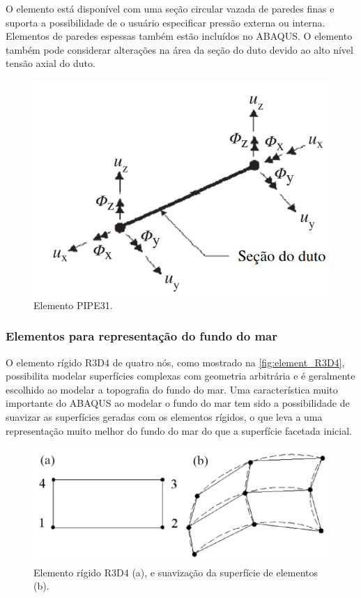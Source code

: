 O elemento está disponível com uma seção circular vazada de paredes finas e suporta a possibilidade de o usuário especificar pressão externa ou interna.
Elementos de paredes espessas também estão incluídos no ABAQUS\@.
O elemento também pode considerar alterações na área da seção do duto devido ao alto nível tensão axial do duto.

\begin{figure}[!ht]
    \centering
    \caption{Elemento PIPE31.}\label{fig:elemen_PIPE31H}
    \includegraphics[width=0.5\linewidth]{imagens/elemen_PIPE31H}
\end{figure}


\subsubsection{Elementos para representação do fundo do mar}




O elemento rígido R3D4 de quatro nós, como mostrado na \autoref{fig:element_R3D4}, possibilita modelar superfícies complexas com geometria arbitrária e é geralmente escolhido ao modelar a topografia do fundo do mar. Uma característica muito importante do ABAQUS ao modelar o fundo do mar tem sido a possibilidade de suavizar as superfícies geradas com os elementos rígidos, o que leva a uma representação muito melhor do fundo do mar do que a superfície facetada inicial.

\begin{figure}[!ht]
    \centering
    \caption{Elemento rígido R3D4 (a), e suavização da superfície de elementos (b).}\label{fig:element_R3D4}
    \includegraphics[width=0.7\linewidth]{imagens/element_R3D4}
\end{figure}

